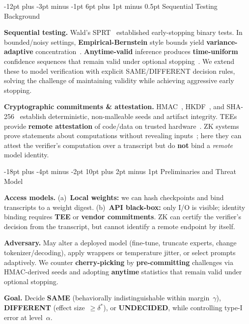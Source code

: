 \documentclass[11pt]{article}
\makeatletter
\renewcommand\section{\@startsection{section}{1}{\z@}%
  {-18pt plus -4pt minus -2pt}%
  {10pt plus 2pt minus 1pt}%
  {\normalfont\Large\bfseries}}
\renewcommand\subsection{\@startsection{subsection}{2}{\z@}%
  {-12pt plus -3pt minus -1pt}%
  {6pt plus 1pt minus 0.5pt}%
  {\normalfont\large\bfseries}}
\makeatother
\begin{document}
\subsection{Sequential Testing Background}

\textbf{Sequential testing.} Wald's SPRT~\cite{wald1945sprt} established early-stopping binary tests. In bounded/noisy settings, \textbf{Empirical-Bernstein} style bounds yield \textbf{variance-adaptive} concentration~\cite{maurer2009empiricalbernstein,audibert2009exploration}. \textbf{Anytime-valid} inference produces \textbf{time-uniform} confidence sequences that remain valid under optional stopping~\cite{howard2021timeuniform,howard2021confidenceSequences}. We extend these to model verification with explicit SAME/DIFFERENT decision rules, solving the challenge of maintaining validity while achieving aggressive early stopping.

\textbf{Cryptographic commitments \& attestation.} HMAC~\cite{rfc2104}, HKDF~\cite{rfc5869}, and SHA-256~\cite{fips180-4} establish deterministic, non-malleable seeds and artifact integrity. TEEs provide \textbf{remote attestation} of code/data on trusted hardware~\cite{costan2016sgx}. ZK systems prove statements about computations without revealing inputs~\cite{bensasson2014snarks,bunz2018bulletproofs}; here they can attest the verifier's computation over a transcript but do \textbf{not} bind a \emph{remote} model identity.

\section{Preliminaries and Threat Model}

\textbf{Access models.} (a)~\textbf{Local weights:} we can hash checkpoints and bind transcripts to a weight digest. (b)~\textbf{API black-box:} only I/O is visible; identity binding requires \textbf{TEE} or \textbf{vendor commitments}. ZK can certify the verifier's decision from the transcript, but cannot identify a remote endpoint by itself.

\textbf{Adversary.} May alter a deployed model (fine-tune, truncate experts, change tokenizer/decoding), apply wrappers or temperature jitter, or select prompts adaptively. We counter \textbf{cherry-picking} by \textbf{pre-committing} challenges via HMAC-derived seeds and adopting \textbf{anytime} statistics that remain valid under optional stopping.

\textbf{Goal.} Decide \textbf{SAME} (behaviorally indistinguishable within margin~$\gamma$), \textbf{DIFFERENT} (effect size~${\geq}\delta^*$), or \textbf{UNDECIDED}, while controlling type-I error at level~$\alpha$.
\end{document}
